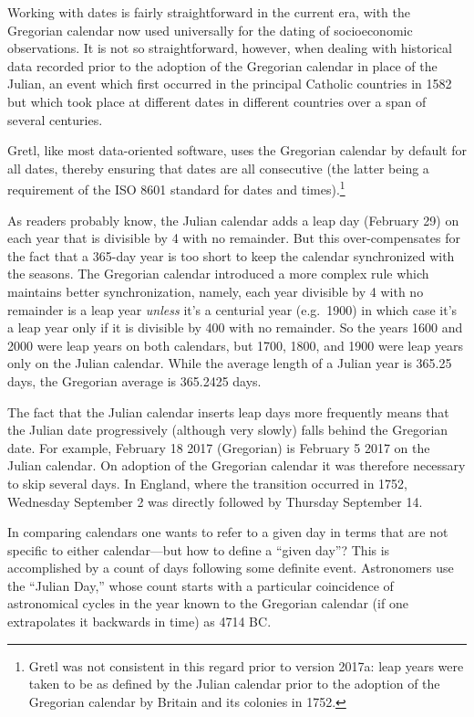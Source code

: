 Working with dates is fairly straightforward in the current era, with
the Gregorian calendar now used universally for the dating of
socioeconomic observations. It is not so straightforward, however,
when dealing with historical data recorded prior to the adoption of
the Gregorian calendar in place of the Julian, an event which first
occurred in the principal Catholic countries in 1582 but which took
place at different dates in different countries over a span of several
centuries.

Gretl, like most data-oriented software, uses the Gregorian calendar
by default for all dates, thereby ensuring that dates are all
consecutive (the latter being a requirement of the ISO 8601 standard
for dates and times).\footnote{Gretl was not consistent in this regard
  prior to version 2017a: leap years were taken to be as defined by
  the Julian calendar prior to the adoption of the Gregorian calendar
  by Britain and its colonies in 1752.}

As readers probably know, the Julian calendar adds a leap day
(February 29) on each year that is divisible by 4 with no
remainder. But this over-compensates for the fact that a 365-day year
is too short to keep the calendar synchronized with the seasons. The
Gregorian calendar introduced a more complex rule which maintains
better synchronization, namely, each year divisible by 4 with no
remainder is a leap year \textit{unless} it's a centurial year (e.g.\
1900) in which case it's a leap year only if it is divisible by 400
with no remainder.  So the years 1600 and 2000 were leap years on both
calendars, but 1700, 1800, and 1900 were leap years only on the Julian
calendar. While the average length of a Julian year is 365.25 days,
the Gregorian average is 365.2425 days. 

The fact that the Julian calendar inserts leap days more frequently
means that the Julian date progressively (although very slowly) falls
behind the Gregorian date. For example, February 18 2017 (Gregorian)
is February 5 2017 on the Julian calendar. On adoption of the
Gregorian calendar it was therefore necessary to skip several days. In
England, where the transition occurred in 1752, Wednesday September 2
was directly followed by Thursday September 14.

In comparing calendars one wants to refer to a given day in terms that
are not specific to either calendar---but how to define a ``given
day''? This is accomplished by a count of days following some definite
event. Astronomers use the ``Julian Day,'' whose count starts with a
particular coincidence of astronomical cycles in the year known to the
Gregorian calendar (if one extrapolates it backwards in time) as 4714
BC.

